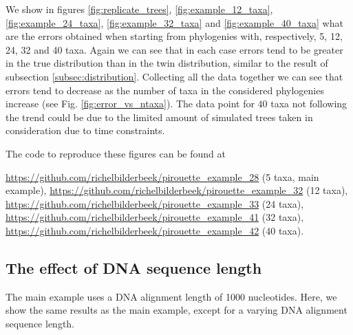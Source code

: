 We show in figures \ref{fig:replicate_trees}, \ref{fig:example_12_taxa}, 
\ref{fig:example_24_taxa}, \ref{fig:example_32_taxa} and 
\ref{fig:example_40_taxa} what are the errors obtained when starting from 
phylogenies with, respectively, 5, 12, 24, 32 and 40 taxa.
Again we can see 
that in each case errors tend to be greater in the true distribution than 
in the twin distribution, similar to the result of subsection \ref{subsec:distribution}.
Collecting all the data together we can see that errors tend to decrease as the number of taxa in the considered phylogenies increase (see Fig. \ref{fig:error_vs_ntaxa}). The data point for $40$ taxa not following the trend could be due to the limited amount of simulated trees taken in consideration due to time constraints.

The code to reproduce these figures can be found at  
\begin{sloppypar}
  \url{https://github.com/richelbilderbeek/pirouette_example_28} (5 taxa, main example),
  \url{https://github.com/richelbilderbeek/pirouette_example_32} (12 taxa),
  \url{https://github.com/richelbilderbeek/pirouette_example_33} (24 taxa),
  \url{https://github.com/richelbilderbeek/pirouette_example_41} (32 taxa),
  \url{https://github.com/richelbilderbeek/pirouette_example_42} (40 taxa). 
\end{sloppypar}

\newpage

\subsection{The effect of DNA sequence length}
\label{subsec:n_nucleotides}

The main example uses a DNA alignment length of 1000 nucleotides.
Here, we show the same results as the main example,
except for a varying DNA alignment sequence length.

